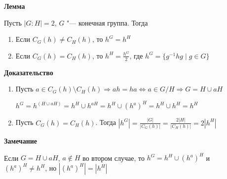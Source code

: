 \documentclass{article}
\begin{document}
\vspace{10pt}

\textbf{Лемма}

Пусть $|G:H| = 2$, $G$ "--- конечная группа. Тогда
\begin{enumerate}
	\item Если $C_G(h) \neq C_H(h)$, то $h^G = h^H$
	\item Если $C_G(h) = C_H(h)$, то $h^H = \frac{h^G}{2}$, где $h^G = \{g^{-1}hg \mid g \in G\}$
\end{enumerate}

\textbf{Доказательство}
\begin{enumerate}
	\item Пусть $a \in C_G(h) \setminus C_H(h) \Rightarrow ah = ha \Leftrightarrow a \in G/H \Rightarrow G = H \cup aH$
	
	$h^G = h^{(H \cup aH)} = h^H \cup h^{aH} = h^H \cup (h^a)^H = h^H \cup h^H = h^H$
	
	\item Пусть $C_G(h) = C_H(h)$. Тогда $|h^G| = \frac{|G|}{|C_G(h)|} = \frac{2|H|}{|C_H(h)|} = 2|h^H|$

\end{enumerate}

\vspace{10pt}

\textbf{Замечание}

Если $G = H \cup aH$, $a \notin H$ во втором случае, то $h^G = h^H \cup (h^a)^H$ и $(h^a)^H \neq h^H$, но $|(h^a)^H| = |h^H|$
\end{document}
